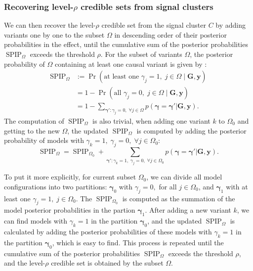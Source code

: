 \documentclass[pdflatex,sn-mathphys-num]{sn-jnl}%
\theoremstyle{thmstyleone}%
\theoremstyle{thmstyletwo}%
\theoremstyle{thmstylethree}%
\begin{document}
\subsubsection{Recovering level-$\rho$ credible sets from signal clusters}
We can then recover the level-$\rho$ credible set from the signal cluster $C$ by adding variants one by one to the subset $\Omega$ in descending order of their posterior probabilities in the effect, until the cumulative sum of the posterior probabilities $\operatorname{SPIP}_{\Omega}$ exceeds the threshold $\rho$. For the subset of variants $\Omega$, the posterior probability of $\Omega$ containing at least one causal variant is given by \cite{samaddar2024bayesian}:
\begin{align}
    \operatorname{SPIP}_{\Omega} &:= \operatorname{Pr}\left(\text{at least one }\gamma_j=1, \; j \in \Omega \mid \mathbf{G},\mathbf{y}\right) \\
    &= 1 - \operatorname{Pr}\left(\text{all }\gamma_j=0,\; j \in \Omega \mid \mathbf{G},\mathbf{y}\right) \\
    &= 1 - \sum_{\boldsymbol{\gamma}':\gamma_{j} = 0, \; \forall j \in \Omega} p(\boldsymbol{\gamma}=\boldsymbol{\gamma}'|\mathbf{G},\mathbf{y}).
\end{align}
The computation of $\operatorname{SPIP}_{\Omega}$ is also trivial, when adding one variant $k$ to $\Omega_0$ and getting to the new $\Omega$, the updated $\operatorname{SPIP}_{\Omega}$ is computed by adding the posterior probability of models with $\gamma_k=1,\; \gamma_j=0, \; \forall j \in \Omega_0$:
\begin{equation}
    \operatorname{SPIP}_{\Omega} = \operatorname{SPIP}_{\Omega_0} + \sum_{\boldsymbol{\gamma}':\gamma_{k} = 1, \; \gamma_{j} = 0, \; \forall j \in \Omega_0} p(\boldsymbol{\gamma}=\boldsymbol{\gamma}'|\mathbf{G},\mathbf{y}).    
\end{equation}

To put it more explicitly, for current subset $\Omega_0$, we can divide all model configurations into two partitions: $\boldsymbol{\gamma}_{0}$ with $\gamma_j=0,$ for all $j \in \Omega_0$, and $\boldsymbol{\gamma}_{1}$ with at least one $\gamma_j=1, \; j\in \Omega_0$. The $\operatorname{SPIP}_{\Omega_0}$ is computed as the summation of the model posterior probabilities in the partion $\boldsymbol{\gamma}_1$. After adding a new variant $k$, we can find models with $\gamma_k=1$ in the partition $\boldsymbol{\gamma}_0$, and the updated $\operatorname{SPIP}_{\Omega}$ is calculated by adding the posterior probabilities of these models with $\gamma_k=1$ in the partition $\boldsymbol{\gamma}_0$, which is easy to find. This process is repeated until the cumulative sum of the posterior probabilities $\operatorname{SPIP}_{\Omega}$ exceeds the threshold $\rho$, and the level-$\rho$ credible set is obtained by the subset $\Omega$.
\end{document}
